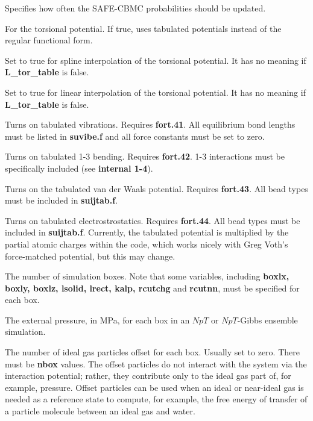 \documentclass[12pt,letterpaper]{article}
\begin{document}
 Specifies how often the SAFE-CBMC probabilities should be updated.

 For the torsional potential. If true, uses tabulated potentials instead of 
the regular functional form.

 Set to true for spline interpolation of the torsional potential. 
It has no meaning if {\textbf{L\_tor\_table}} is false.

 Set to true for linear interpolation of the torsional potential.
It has no meaning if {\textbf{L\_tor\_table}} is false.

 Turns on tabulated vibrations.  Requires {\textbf{fort.41}}.
All equilibrium bond lengths must be listed in {\textbf{suvibe.f}} and all force constants must be set to zero.

 Turns on tabulated 1-3 bending.  Requires {\textbf{fort.42}}. 
1-3 interactions must be specifically included (see \textbf{internal 1-4}).

 Turns on the tabulated van der Waals potential.  Requires {\textbf{fort.43}}.  
All bead types must be included in {\textbf{suijtab.f}}.

 Turns on tabulated electrostrostatics.  Requires {\textbf{fort.44}}.  
All bead types must be included in {\textbf{suijtab.f}}.  
Currently, the tabulated potential is multiplied by the partial atomic charges within the code, 
which works nicely with Greg Voth's force-matched potential, but this may change.

 The number of simulation boxes.
Note that some variables, including {\textbf {boxlx, boxly, boxlz, lsolid, lrect, kalp, rcutchg}} and {\textbf{rcutnn}}, 
must be specified for each box.

 The external pressure, in MPa, for each box in an $NpT$ or $NpT$-Gibbs ensemble simulation.

 The number of ideal gas particles offset for each box.  
Usually set to zero.  There must be {\textbf{nbox}} values.  
The offset particles do not interact with the system via the interaction potential;
rather, they contribute only to the ideal gas part of, for example, pressure.
Offset particles can be used when an ideal or near-ideal gas is needed as a reference state to compute,
for example, the free energy of transfer of a particle molecule between an ideal gas and water.
\end{document}
